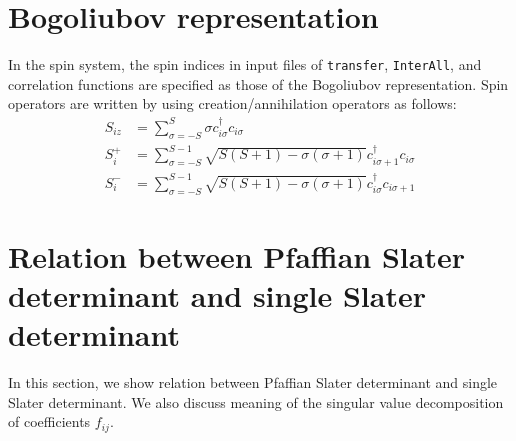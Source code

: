 \section{Bogoliubov representation}\label{sec_bogoliubov_rep}

In the spin system,
the spin indices in input files of \verb|transfer|, \verb|InterAll|,
and correlation functions are specified as those of the Bogoliubov representation.
Spin operators are written by using creation/annihilation operators as follows:
\begin{align}
  S_{i z} &= \sum_{\sigma = -S}^{S} \sigma c_{i \sigma}^\dagger c_{i \sigma}
  \\
  S_{i}^+ &= \sum_{\sigma = -S}^{S-1} 
  \sqrt{S(S+1) - \sigma(\sigma+1)} 
  c_{i \sigma+1}^\dagger c_{i \sigma}
  \\
  S_{i}^- &= \sum_{\sigma = -S}^{S-1} 
  \sqrt{S(S+1) - \sigma(\sigma+1)} 
  c_{i \sigma}^\dagger c_{i \sigma+1}
\end{align}

\section{Relation between Pfaffian Slater determinant and single Slater determinant}
\label{sec:PuffAndSlater}
In this section, we show relation between Pfaffian Slater determinant and single Slater determinant.
We also discuss meaning of the singular value decomposition of coefficients $f_{ij}$. 
